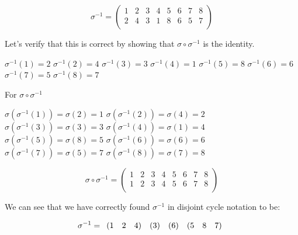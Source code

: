 \documentclass[a4paper]{article}
\begin{document}
\begin{myparindent}{0pt}
\[
    \sigma^{-1} =
  \begin{pmatrix}
      1 & 2 & 3 & 4 & 5 & 6 & 7 & 8 \\
      2 & 4 & 3 & 1 & 8 & 6 & 5 & 7 \\
  \end{pmatrix}
\]

Let's verify that this is correct by showing that $\sigma \circ \sigma^{-1}$ is the identity.

$\sigma^{-1}(1) = 2$ \newline
$\sigma^{-1}(2) = 4$ \newline
$\sigma^{-1}(3) = 3$ \newline
$\sigma^{-1}(4) = 1$ \newline
$\sigma^{-1}(5) = 8$ \newline
$\sigma^{-1}(6) = 6$ \newline
$\sigma^{-1}(7) = 5$ \newline
$\sigma^{-1}(8) = 7$ \newline

For $\sigma \circ \sigma^{-1}$

$\sigma(\sigma^{-1}(1)) = \sigma(2) = 1$ \newline
$\sigma(\sigma^{-1}(2)) = \sigma(4) = 2$ \newline
$\sigma(\sigma^{-1}(3)) = \sigma(3) = 3$ \newline
$\sigma(\sigma^{-1}(4)) = \sigma(1) = 4$ \newline
$\sigma(\sigma^{-1}(5)) = \sigma(8) = 5$ \newline
$\sigma(\sigma^{-1}(6)) = \sigma(6) = 6$ \newline
$\sigma(\sigma^{-1}(7)) = \sigma(5) = 7$ \newline
$\sigma(\sigma^{-1}(8)) = \sigma(7) = 8$ \newline

\[
    \sigma \circ \sigma^{-1} =
    \begin{pmatrix}
        1 & 2 & 3 & 4 & 5 & 6 & 7 & 8 \\
        1 & 2 & 3 & 4 & 5 & 6 & 7 & 8 \\
    \end{pmatrix}
\]

We can see that we have correctly found $\sigma^{-1}$ in disjoint cycle notation to be:

\[
    \noindent \sigma^{-1} = \begin{array}{rrr} (1 & 2 & 4) \end{array}
    \noindent \begin{array}{r} (3) \end{array}
    \noindent \begin{array}{r} (6) \end{array}
    \noindent \begin{array}{rrr} (5 & 8 & 7) \end{array}
\]


\end{myparindent}
\end{document}
